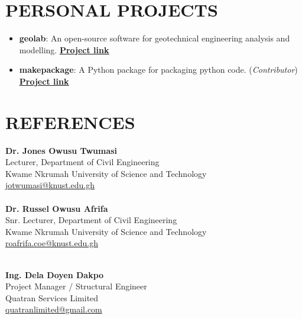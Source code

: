 \documentclass[letterpaper, 12pt]{article}
\newcommand{\cvsection}[1]{
	
	\section*{#1}
}
\begin{document}
	
	\cvsection{PERSONAL PROJECTS}
	
	\begin{itemize}[leftmargin=*]
		
		\item \textbf{geolab}: An open-source software for geotechnical engineering analysis and modelling. \href{https://www.github.com/patrickboateng/geolab}{\underline{\textbf{Project link}}}
		
		\item \textbf{makepackage}: A Python package for packaging python code. (\textit{Contributor})
		\href{https://github.com/nyggus/makepackage}{\underline{\textbf{Project link}}}
		
	\end{itemize}
	
	
	\cvsection{REFERENCES}
	
	
	\begin{multicols}{2}
		\textbf{Dr. Jones Owusu Twumasi} \\ [4pt]
		Lecturer, Department of Civil Engineering \\ [4pt]
		Kwame Nkrumah University of Science and Technology \\ [4pt]
		\faEnvelopeSquare \space \href{mailto:jotwumasi@knust.edu.gh}{jotwumasi@knust.edu.gh} \\ [4pt]
		\faPhone {} \\ [4pt]
		
		\textbf{Dr. Russel Owusu Afrifa} \\ [4pt]
		Snr. Lecturer, Department of Civil Engineering \\ [4pt]
		Kwame Nkrumah University of Science and Technology \\ [4pt]
		\faEnvelopeSquare \space \href{mailto:roafrifa.coe@knust.edu.gh}{roafrifa.coe@knust.edu.gh} \\ [4pt]
		\faPhone {} \\
		
		\columnbreak
		
		\textbf{Ing. Dela Doyen Dakpo} \\ [4pt]
		Project Manager / Structural Engineer \\ [4pt]
		Quatran Services Limited \\ [4pt]
		\faEnvelopeSquare \space \href{mailto:quatranlimited@gmail.com}{quatranlimited@gmail.com}\\[4pt]
		\faPhone {} \\ [4pt]

	\end{multicols}
	
\end{document}
